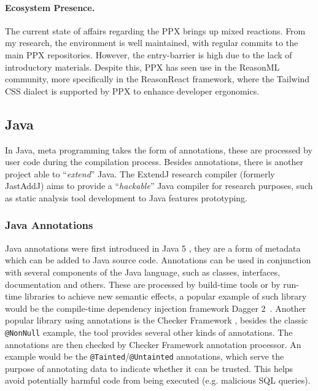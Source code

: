 \begin{displayquote}
    \begin{compactitem}
        \item \texttt{[%
        \item \texttt{[%
    \end{compactitem}
\end{displayquote}

\paragraph{Ecosystem Presence.}
The current state of affairs regarding the PPX brings up mixed reactions.
From my research, the environment is well maintained, with regular commits to the main PPX repositories.
However, the entry-barrier is high due to the lack of introductory materials.
Despite this, PPX has seen use in the ReasonML community, more specifically in the ReasonReact framework,
where the Tailwind CSS dialect is supported by PPX to enhance developer ergonomics.

\subsection{Java}\label{sec:lang-preprocessors:java}

In Java, meta programming takes the form of annotations, these are processed by user code during the compilation process.
Besides annotations, there is another project able to “\emph{extend}” Java.
The ExtendJ research compiler (formerly JastAddJ) \autocite{Ekman2007} aims to provide a “\emph{hackable}” Java compiler for research purposes,
such as static analysis tool development to Java features prototyping.

\subsubsection*{Java Annotations}\label{sec:lang-preprocessors:java:annotation}

Java annotations were first introduced in Java 5 \autocite{JSR269},
they are a form of metadata which can be added to Java source code.
Annotations can be used in conjunction with several components of the Java language,
such as classes, interfaces, documentation and others.
These are processed by build-time tools or by run-time libraries to achieve new semantic effects,
a popular example of such library would be the compile-time dependency injection framework Dagger 2~\autocite{Dagger2}.
Another popular library using annotations is the Checker Framework \autocite{CheckerFramework2018},
besides the classic \texttt{@NonNull} example, the tool provides several other kinds of annotations.
The annotations are then checked by Checker Framework annotation processor.
An example would be the \texttt{@Tainted}/\texttt{@Untainted} annotations,
which serve the purpose of annotating data to indicate whether it can be trusted.
This helps avoid potentially harmful code from being executed (e.g. malicious SQL queries).

